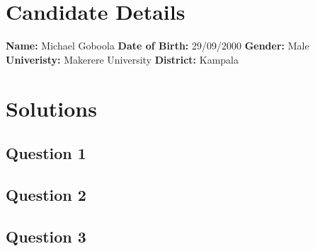 \documentclass[a4paper,12pt]{article}
\begin{document}
\section{Candidate Details}

\thispagestyle{empty}

\textbf{Name\space:} Michael Goboola \newline
\textbf{Date of Birth:} 29/09/2000 \newline
\textbf{Gender\space       :} Male \newline
\textbf{Univeristy\space   :} Makerere University \newline
\textbf{District\space     :} Kampala \newline

\thispagestyle{empty}

\section{Solutions}
\thispagestyle{empty}
\subsection{Question 1}
\thispagestyle{empty}
\thispagestyle{empty}

\subsection{Question 2}
\thispagestyle{empty}
\thispagestyle{empty}

\subsection{Question 3}
\thispagestyle{empty}
\thispagestyle{empty}
\end{document}
